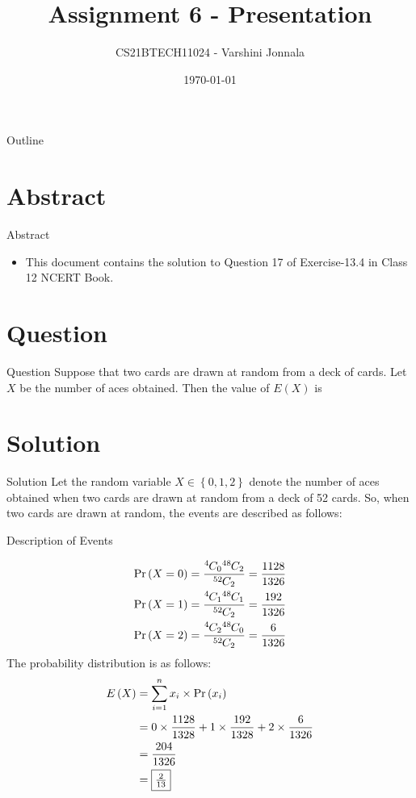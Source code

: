 \documentclass{beamer}
\title{Assignment 6 - Presentation}
\author{CS21BTECH11024 - Varshini Jonnala}
\date{\today}
\providecommand{\pr}[1]{\ensuremath{\Pr\left(#1\right)}}
\providecommand{\cbrak}[1]{\ensuremath{\left\{#1\right\}}}
\providecommand{\brak}[1]{\ensuremath{\left(#1\right)}}
\newcommand*{\permcomb}[4][0mu]{{{}^{#3}\mkern#1#2_{#4}}}
\newcommand*{\comb}[1][-1mu]{\permcomb[#1]{C}}
\begin{document}
\begin{frame}
    \titlepage 
\end{frame}

\begin{frame}{Outline}
    \tableofcontents
\end{frame}

\section{Abstract}
\begin{frame}{Abstract}
    \begin{itemize}
        \item This document contains the solution to Question 17 of Exercise-13.4 in Class 12 NCERT Book. 
    \end{itemize}
\end{frame}

\section{Question}
\begin{frame}{Question}
Suppose that two cards are drawn at random from a deck of cards. Let $X$ be the
number of aces obtained. Then the value of $E(X)$ is
\end{frame}

\section{Solution}
\begin{frame}{Solution}
     Let the random variable $X \in \cbrak{0,1,2}$ denote the number of aces obtained when two cards are drawn at random from a deck of 52 cards. So, when two cards are drawn at random, the events are described as follows:

    \begin{table}[ht!]
        \centering
        
    	\caption{Description of Events}
    	\label{Tables:Table}
    \end{table}
\end{frame}    

    \begin{align}
        \pr{X = 0} = \frac{\comb{4}{0} \comb{48}{2}}{\comb{52}{2}} = \frac{1128}{1326}\\
         \pr{X = 1} = \frac{\comb{4}{1} \comb{48}{1}}{\comb{52}{2}} = \frac{192}{1326}\\
          \pr{X = 2} = \frac{\comb{4}{2} \comb{48}{0}}{\comb{52}{2}} = \frac{6}{1326}
    \end{align}
    The probability distribution is as follows:
    \begin{align}
    E\brak{X} &= \sum_{i = 1}^{n}x_i \times \pr{x_i}\\
    &= 0 \times \frac{1128}{1328} + 1 \times \frac{192}{1328} + 2\times \frac{6}{1326}\\
    &= \frac{204}{1326}\\
    &= \fbox{$\frac{2}{13}$}
    \end{align}
    
\end{document}
